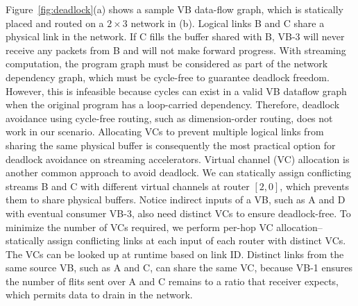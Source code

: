 Figure~\ref{fig:deadlock}(a) shows a sample VB data-flow graph, which is statically placed and routed on a $2\times3$ network in (b). 
Logical links B and C share a physical link in the network. If C fills the buffer shared with B, VB-3 will never receive any packets from B and will not make forward progress.
  With streaming computation, the program graph must be considered as part of the network dependency graph, which must be cycle-free to guarantee deadlock freedom. However, this is infeasible because cycles can exist in a valid VB dataflow graph when the original program has a loop-carried dependency. Therefore, deadlock avoidance using cycle-free routing, such as dimension-order routing, does not work in our scenario. 
Allocating VCs to prevent multiple logical links from sharing the same physical buffer is consequently the most practical option for deadlock avoidance on streaming accelerators.
Virtual channel (VC) allocation is another common approach to avoid deadlock. We can statically assign conflicting streams B and C with different
virtual channels at router $[2,0]$, which prevents them to share physical buffers. 
Notice indirect inputs of a VB, such as A and D with eventual consumer VB-3,
also need distinct VCs to ensure deadlock-free. To minimize the number of VCs required, we perform per-hop VC allocation--statically
assign conflicting links at each input of each router with distinct VCs. The VCs can be looked up at runtime based on link ID.
Distinct links from the same source VB, such as A and C, can share the same VC, because VB-1 ensures the number of flits sent over A and C remains
to a ratio that receiver expects, which permits data to drain in the network.
\fi

